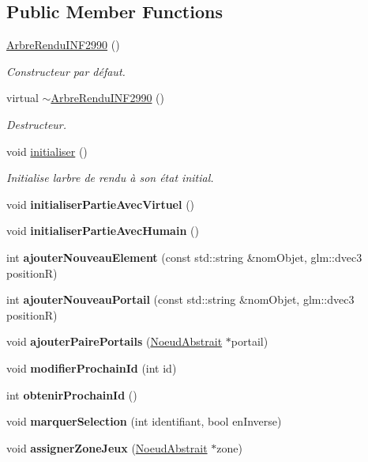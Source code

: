 \subsection*{Public Member Functions}
\begin{DoxyCompactItemize}
\item 
\hyperlink{group__inf2990_ga67528b7fa54e8ef8f96ef2e0bad06d2d}{Arbre\+Rendu\+I\+N\+F2990} ()
\begin{DoxyCompactList}\small\item\em Constructeur par défaut. \end{DoxyCompactList}\item 
virtual \hyperlink{group__inf2990_gaa67526b2fd719f6bcef7a4547bd25c7b}{$\sim$\+Arbre\+Rendu\+I\+N\+F2990} ()
\begin{DoxyCompactList}\small\item\em Destructeur. \end{DoxyCompactList}\item 
void \hyperlink{group__inf2990_ga678d89e1f12ae16ee7dcf6de3db637a3}{initialiser} ()
\begin{DoxyCompactList}\small\item\em Initialise l\textquotesingle{}arbre de rendu à son état initial. \end{DoxyCompactList}\item 
void {\bfseries initialiser\+Partie\+Avec\+Virtuel} ()
\item 
void {\bfseries initialiser\+Partie\+Avec\+Humain} ()
\item 
int {\bfseries ajouter\+Nouveau\+Element} (const std\+::string \&nom\+Objet, glm\+::dvec3 positionR)
\item 
int {\bfseries ajouter\+Nouveau\+Portail} (const std\+::string \&nom\+Objet, glm\+::dvec3 positionR)
\item 
void {\bfseries ajouter\+Paire\+Portails} (\hyperlink{class_noeud_abstrait}{Noeud\+Abstrait} $\ast$portail)
\item 
\hypertarget{class_arbre_rendu_i_n_f2990_a00fc30fb9a84c745a7a73007e66fce74}{}\label{class_arbre_rendu_i_n_f2990_a00fc30fb9a84c745a7a73007e66fce74} 
void {\bfseries modifier\+Prochain\+Id} (int id)
\item 
\hypertarget{class_arbre_rendu_i_n_f2990_aa9fa6c79c277ea85540bb8e80e7cbac9}{}\label{class_arbre_rendu_i_n_f2990_aa9fa6c79c277ea85540bb8e80e7cbac9} 
int {\bfseries obtenir\+Prochain\+Id} ()
\item 
void {\bfseries marquer\+Selection} (int identifiant, bool en\+Inverse)
\item 
void {\bfseries assigner\+Zone\+Jeux} (\hyperlink{class_noeud_abstrait}{Noeud\+Abstrait} $\ast$zone)
\end{DoxyCompactItemize}
